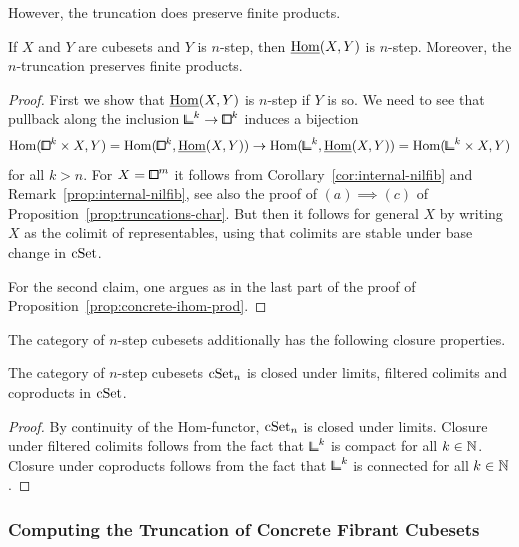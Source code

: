 However, the truncation does preserve finite products.

\begin{proposition}\label{prop:n-trunc-ihom-prod}
If $X$ and $Y$ are cubesets and $Y$ is $n$-step, then $\underline{\operatorname{Hom}}(X,Y)$ is $n$-step.
Moreover, the $n$-truncation preserves finite products.
\end{proposition}

\begin{proof}
First we show that $\underline{\operatorname{Hom}}(X,Y)$ is $n$-step if $Y$ is so.
We need to see that pullback along the inclusion ${\bbcor}^k\to{\bbox}^k$ induces a bijection
\[
    \hom({\bbox}^k\times X,Y) = \hom({\bbox}^k,\ihom(X,Y)) \to \hom({\bbcor}^k,\ihom(X,Y)) = \hom({\bbcor}^k\times X,Y)
\]
for all $k>n$.
For $X = {\bbox}^m$ it follows from Corollary~\ref{cor:internal-nilfib}
and Remark~\ref{prop:internal-nilfib},
see also the proof of $(a)\implies(c)$ of Proposition~\ref{prop:truncations-char}.
But then it follows for general $X$ by writing $X$ as the colimit of representables,
using that colimits are stable under base change in $\mathrm{cSet}$.

For the second claim, one argues as in the last part of the proof of
Proposition~\ref{prop:concrete-ihom-prod}.
\end{proof}

The category of $n$-step cubesets additionally has the following closure properties.

\begin{proposition}\label{prop:n-trunc-closure}
The category of $n$-step cubesets $\mathrm{cSet}_n$ is closed under limits, filtered colimits and coproducts in $\mathrm{cSet}$.
\end{proposition}

\begin{proof}
	By continuity of the Hom-functor, $\mathrm{cSet}_n$ is closed under limits.
Closure under filtered colimits follows from the fact that ${\bbcor}^k$ is compact for all $k\in{\mathbb{N}}$.
Closure under coproducts follows from the fact that ${\bbcor}^k$ is connected for all $k\in{\mathbb{N}}$.
\end{proof}



\subsubsection{Computing the Truncation of Concrete Fibrant Cubesets}\label{ssec:truncation-compute}

